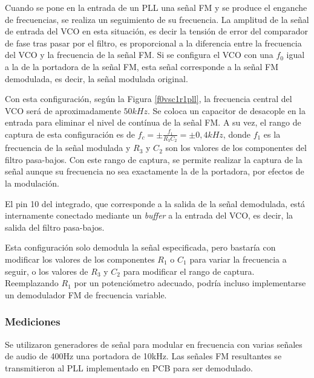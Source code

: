 \documentclass{article}
\begin{document}
Cuando se pone en la entrada de un PLL una señal FM y se produce el enganche de frecuencias, se realiza un seguimiento de su frecuencia. La amplitud de la señal de entrada del VCO en esta situación, es decir la tensión de error del comparador de fase tras pasar por el filtro, es proporcional a la diferencia entre la frecuencia del VCO y la frecuencia de la señal FM. Si se configura el VCO con una $f_{0}$ igual a la de la portadora de la señal FM, esta señal corresponde a la señal FM demodulada, es decir, la señal modulada original.

Con esta configuración, según la Figura \ref{f0vsc1r1pll}, la frecuencia central del VCO será de aproximadamente $50kHz$. Se coloca un capacitor de desacople en la entrada para eliminar el nivel de contínua de la señal FM. A su vez, el rango de captura de esta configuración es de $f_{c}=\pm \frac{f_{1}}{R_{3}C_{2}}=\pm0,4kHz$, donde $f_{1}$ es la frecuencia de la señal modulada y  $R_{3}$ y $C_{2}$ son los valores de los componentes del filtro pasa-bajos. Con este rango de captura, se permite realizar la captura de la señal aunque su frecuencia no sea exactamente la de la portadora, por efectos de la modulación.

El pin 10 del integrado, que corresponde a la salida de la señal demodulada, está internamente conectado mediante un \emph{buffer} a la entrada del VCO, es decir, la salida del filtro pasa-bajos.

Esta configuración solo demodula la señal especificada, pero bastaría con modificar los valores de los componentes $R_{1}$ o $C_{1}$ para variar la frecuencia a seguir, o los valores de $R_{3}$ y $C_{2}$ para modificar el rango de captura. Reemplazando $R_{1}$ por un potenciómetro adecuado, podría incluso implementarse un demodulador FM de frecuencia variable.

\subsubsection{Mediciones}
Se utilizaron generadores de señal para modular en frecuencia con varias señales de audio de 400Hz una portadora de 10kHz. Las señales FM resultantes se transmitieron al PLL implementado en PCB para ser demodulado.
\end{document}
